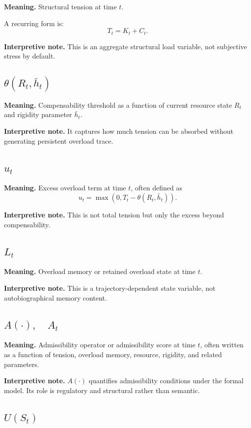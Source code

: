 \documentclass[11pt,a4paper]{article}
\begin{document}
	\textbf{Meaning.} Structural tension at time $t$.
	
	A recurring form is:
	\[
	T_t = K_t + C_t.
	\]
	
	\textbf{Interpretive note.} This is an aggregate structural load variable, not subjective stress by default.
	
	\subsection{$\theta(R_t,\bar h_t)$}
	
	\textbf{Meaning.} Compensability threshold as a function of current resource state $R_t$ and rigidity parameter $\bar h_t$.
	
	\textbf{Interpretive note.} It captures how much tension can be absorbed without generating persistent overload trace.
	
	\subsection{$u_t$}
	
	\textbf{Meaning.} Excess overload term at time $t$, often defined as
	\[
	u_t = \max(0, T_t - \theta(R_t,\bar h_t)).
	\]
	
	\textbf{Interpretive note.} This is not total tension but only the excess beyond compensability.
	
	\subsection{$L_t$}
	
	\textbf{Meaning.} Overload memory or retained overload state at time $t$.
	
	\textbf{Interpretive note.} This is a trajectory-dependent state variable, not autobiographical memory content.
	
	\subsection{$A(\cdotp), \quad A_t$}
	
	\textbf{Meaning.} Admissibility operator or admissibility score at time $t$, often written as a function of tension, overload memory, resource, rigidity, and related parameters.
	
	\textbf{Interpretive note.} $A(\cdotp)$ quantifies admissibility conditions under the formal model. Its role is regulatory and structural rather than semantic.
	
	\subsection{$U(S_t)$}
	
\end{document}
